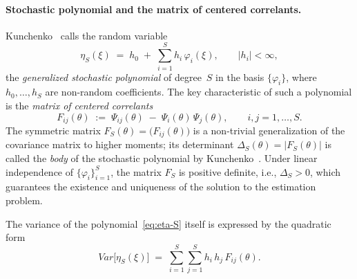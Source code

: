 \documentclass[11pt]{article}
\def\mathbf#1{#1}%
\def\mathrm#1{#1}%
\theoremstyle{definition}
\newcommand{\Var}{\mathrm{Var}}
\begin{document}
\paragraph{Stochastic polynomial and the matrix of centered correlants.}
Kunchenko~\citep[ch.~3]{kunchenko2002} calls the random variable
\begin{equation}\label{eq:eta-S}
  \eta_S(\xi)
  \;=\; h_0 \;+\; \sum_{i=1}^{S} h_i\,\varphi_i(\xi),
  \qquad |h_i| < \infty,
\end{equation}
the \emph{generalized stochastic polynomial} of degree~$S$ in the basis
$\{\varphi_i\}$, where $h_0, \ldots, h_S$ are non-random coefficients.
The key characteristic of such a polynomial is the \emph{matrix of centered
correlants}
\begin{equation}\label{eq:F-matrix}
  F_{ij}(\theta)
  \;:=\; \Psi_{ij}(\theta) \;-\; \Psi_i(\theta)\,\Psi_j(\theta),
  \qquad i, j = 1, \ldots, S.
\end{equation}
The symmetric matrix $\mathbf{F}_S(\theta) = \bigl(F_{ij}(\theta)\bigr)$ is
a non-trivial generalization of the covariance matrix to higher moments; its
determinant $\Delta_S(\theta) = |\mathbf{F}_S(\theta)|$ is called the
\emph{body} of the stochastic polynomial by
Kunchenko~\citep{kunchenko2006stochastic}. Under linear independence of
$\{\varphi_i\}_{i=1}^{S}$, the matrix $\mathbf{F}_S$ is positive definite,
i.e., $\Delta_S > 0$, which guarantees the existence and uniqueness of the
solution to the estimation problem.

The variance of the polynomial~\eqref{eq:eta-S} itself is expressed by the
quadratic form
\begin{equation}\label{eq:var-eta}
  \Var\bigl[\eta_S(\xi)\bigr]
  \;=\; \sum_{i=1}^{S}\sum_{j=1}^{S} h_i\,h_j\,F_{ij}(\theta).
\end{equation}
\end{document}
